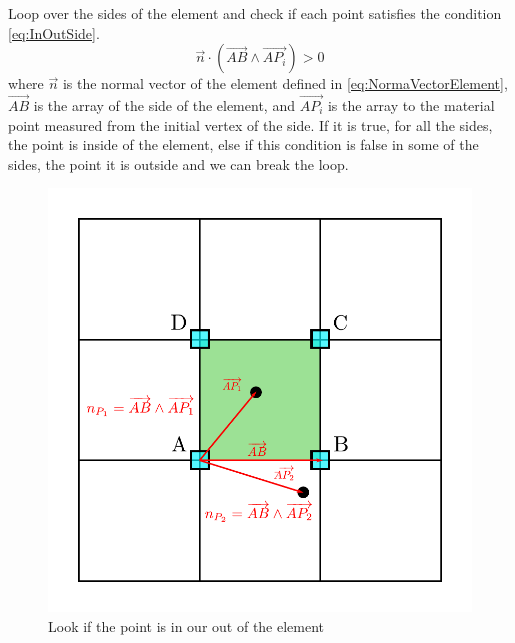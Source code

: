 \begin{enumerate}
  Loop over the sides of the element and check if each point satisfies
  the condition \eqref{eq:InOutSide}.
  \begin{equation}
    \label{eq:InOutSide}
    \overrightarrow{n} \cdot (\overrightarrow{AB} \wedge \overrightarrow{AP_i}) > 0
  \end{equation}
  where $\overrightarrow{n}$ is the normal vector of the element defined in
  \eqref{eq:NormaVectorElement}, $\overrightarrow{AB}$ is the array of
  the side of the element, and $\overrightarrow{AP_i}$ is the array to
  the material point measured from the initial vertex of the side. If
  it is true, for all the sides, the point is inside of the
  element, else if this condition is false in some of the sides,  the
  point it is outside and we can break the loop.  
  
  \begin{figure}
    \centering
    \includegraphics[scale=0.5]{./SECTIONS/TEX/ALGORITHMS/FIGURES/InOutPoint}    
    \caption{Look if the point is in our out of the element}
    \label{fig:InOutPoint}
  \end{figure}



\end{enumerate}
